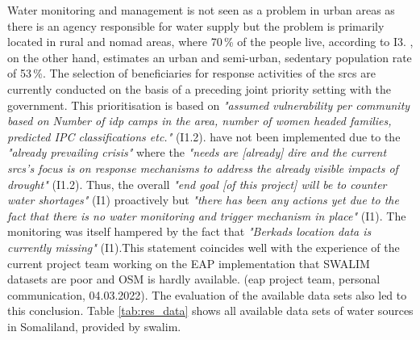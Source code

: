 Water monitoring and management is not seen as a problem in urban areas as there is an agency responsible for water supply but the problem is primarily located in rural and nomad areas, where 70\,\% of the people live, according to I3. \Textcite{republicofsomaliaRepublicSomalilandCountry2021}, on the other hand, estimates an urban and semi-urban, sedentary population rate of 53\,\%.\newline
The selection of beneficiaries for response activities of the \acrshort{srcs} are currently conducted on the basis of a preceding joint priority setting with the government. This prioritisation is based on \textit{"assumed vulnerability per community based on Number of \acrfull{idp} camps in the area, number of women headed families, predicted IPC classifications etc."} (I1.2).  have not been implemented due to the \textit{"already prevailing crisis"} where the \textit{"needs are [already] dire and the current \acrshort{srcs}'s focus is on response mechanisms to address the already visible impacts of drought"} (I1.2). Thus, the overall \textit{"end goal [of this project] will be to counter water shortages"} (I1) proactively but \textit{"there has been any actions yet due to the fact that there is no water monitoring and trigger mechanism in place"} (I1). The monitoring was itself hampered by the fact that \textit{"Berkads location data is currently missing"} (I1).This statement coincides well with the experience of the current project team working on the EAP implementation that SWALIM datasets are poor and OSM is hardly available. (\acrshort{eap} project team, personal communication, 04.03.2022). The evaluation of the available data sets also led to this conclusion.\newline
Table \ref{tab:res_data} shows all available data sets of water sources in Somaliland, provided by \acrshort{swalim}.
\vspace{0.5cm}
